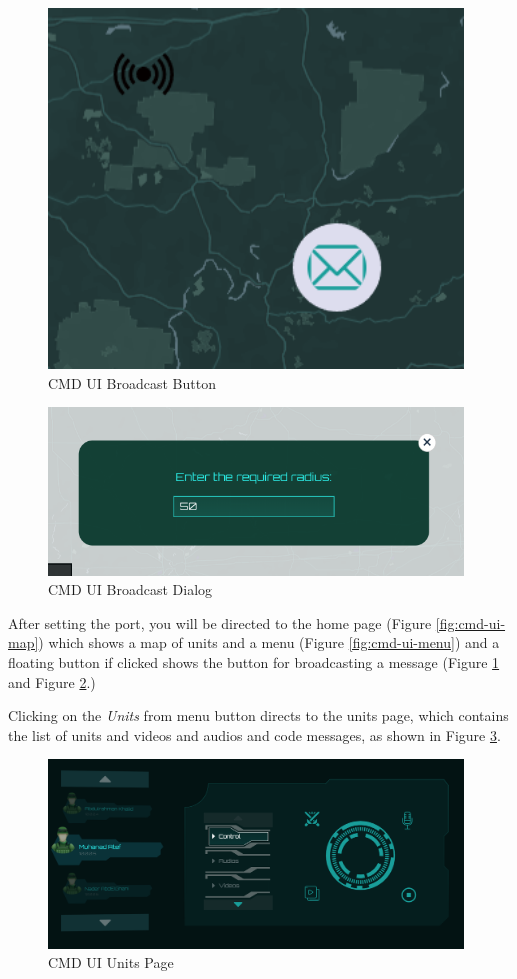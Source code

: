 \begin{figure}[!htb]
    \centering
    \includegraphics[width=11cm]{images/cmd-ui-bcast-button.png}
    \caption{CMD UI Broadcast Button}
    \label{fig:cmd-ui-bcast-button}
\end{figure}

\begin{figure}[!htb]
    \centering
    \includegraphics[width=11cm]{images/cmd-ui-bcast-dialog.png}
    \caption{CMD UI Broadcast Dialog}
    \label{fig:cmd-ui-bcast-dialog}
\end{figure}

After setting the port, you will be directed to the home page (Figure \ref{fig:cmd-ui-map}) which shows a map of units and a menu (Figure \ref{fig:cmd-ui-menu}) and a floating button if clicked shows the button for broadcasting a message (Figure \ref{fig:cmd-ui-bcast-button} and Figure \ref{fig:cmd-ui-bcast-dialog}.)

Clicking on the \textit{Units} from menu button directs to the units page, which contains the list of units and videos and audios and code messages, as shown in Figure \ref{fig:cmd-ui-units}.

\begin{figure}[!htb]
    \centering
    \includegraphics[width=11cm]{images/cmd-ui-units.png}
    \caption{CMD UI Units Page}
    \label{fig:cmd-ui-units}
\end{figure}

